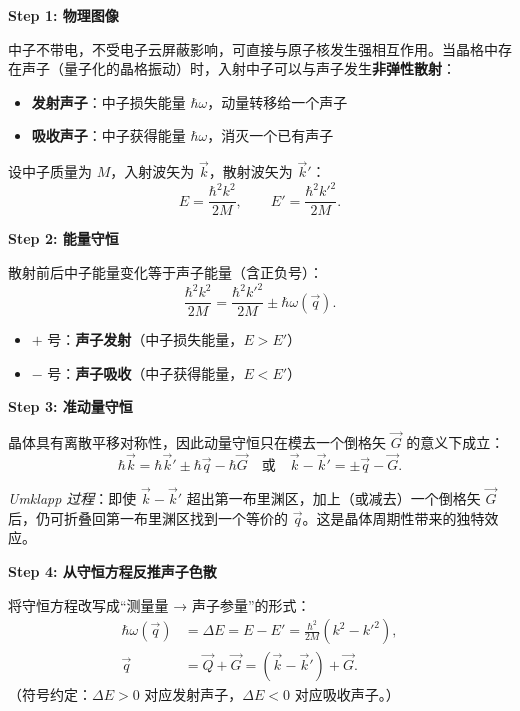 \begin{derivationbox}[标准解题过程]
\textbf{Step 1: 物理图像}

中子不带电，不受电子云屏蔽影响，可直接与原子核发生强相互作用。当晶格中存在声子（量子化的晶格振动）时，入射中子可以与声子发生\textbf{非弹性散射}：
\begin{itemize}
    \item \textbf{发射声子}：中子损失能量 $\hbar\omega$，动量转移给一个声子
    \item \textbf{吸收声子}：中子获得能量 $\hbar\omega$，消灭一个已有声子
\end{itemize}

设中子质量为 $M$，入射波矢为 $\vec k$，散射波矢为 $\vec k'$：
\begin{equation}
E = \frac{\hbar^2k^2}{2M}, \qquad E' = \frac{\hbar^2k'^2}{2M}.
\end{equation}

\textbf{Step 2: 能量守恒}

散射前后中子能量变化等于声子能量（含正负号）：
\begin{equation}
\boxed{\frac{\hbar^2k^2}{2M} = \frac{\hbar^2k'^2}{2M} \pm \hbar\omega(\vec q).}
\label{eq:neutron-energy}
\end{equation}
\begin{itemize}
    \item $+$ 号：\textbf{声子发射}（中子损失能量，$E>E'$）
    \item $-$ 号：\textbf{声子吸收}（中子获得能量，$E<E'$）
\end{itemize}

\textbf{Step 3: 准动量守恒}

晶体具有离散平移对称性，因此动量守恒只在模去一个倒格矢 $\vec G$ 的意义下成立：
\begin{equation}
\boxed{\hbar\vec k = \hbar\vec k' \pm \hbar\vec q - \hbar\vec G \quad\text{或}\quad \vec k - \vec k' = \pm\vec q - \vec G.}
\label{eq:neutron-momentum}
\end{equation}

\textit{Umklapp 过程}：即使 $\vec k-\vec k'$ 超出第一布里渊区，加上（或减去）一个倒格矢 $\vec G$ 后，仍可折叠回第一布里渊区找到一个等价的 $\vec q$。这是晶体周期性带来的独特效应。

\textbf{Step 4: 从守恒方程反推声子色散}

将守恒方程改写成``测量量 → 声子参量''的形式：
\begin{align}
    \hbar\omega(\vec q) &= \Delta E = E - E' = \frac{\hbar^2}{2M}(k^2 - k'^2), \label{eq:phonon-energy-from-neutron}\\
    \vec q &= \vec Q + \vec G = (\vec k - \vec k') + \vec G. \label{eq:phonon-q-from-neutron}
\end{align}
（符号约定：$\Delta E>0$ 对应发射声子，$\Delta E<0$ 对应吸收声子。）


\end{derivationbox}

